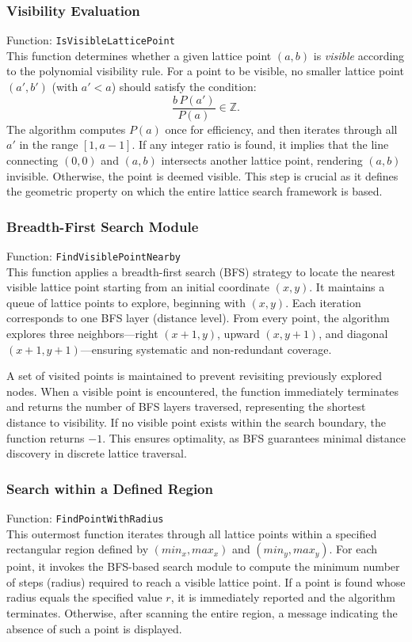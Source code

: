 \documentclass[12pt, reqno]{amsart}
\theoremstyle{definition}
\theoremstyle{remark}
\numberwithin{equation}{section}
\begin{document}
\subsubsection{Visibility Evaluation}

{Function: \texttt{IsVisibleLatticePoint}}\\
This function determines whether a given lattice point $(a,b)$ is \textit{visible} according to the polynomial visibility rule.  
For a point to be visible, no smaller lattice point $(a',b')$ (with $a' < a$) should satisfy the condition:
\[
\frac{b \, P(a')}{P(a)} \in \mathbb{Z}.
\]
The algorithm computes $P(a)$ once for efficiency, and then iterates through all $a'$ in the range $[1, a-1]$. If any integer ratio is found, it implies that the line connecting $(0,0)$ and $(a,b)$ intersects another lattice point, rendering $(a,b)$ invisible. Otherwise, the point is deemed visible.  
This step is crucial as it defines the geometric property on which the entire lattice search framework is based.

\subsubsection{Breadth-First Search Module}
{Function: \texttt{FindVisiblePointNearby}}\\
This function applies a breadth-first search (BFS) strategy to locate the nearest visible lattice point starting from an initial coordinate $(x, y)$.  
It maintains a queue of lattice points to explore, beginning with $(x,y)$. Each iteration corresponds to one BFS layer (distance level). From every point, the algorithm explores three neighbors—right $(x+1, y)$, upward $(x, y+1)$, and diagonal $(x+1, y+1)$—ensuring systematic and non-redundant coverage.  

A set of visited points is maintained to prevent revisiting previously explored nodes. When a visible point is encountered, the function immediately terminates and returns the number of BFS layers traversed, representing the shortest distance to visibility. If no visible point exists within the search boundary, the function returns $-1$.  
This ensures optimality, as BFS guarantees minimal distance discovery in discrete lattice traversal.

\subsubsection{Search within a Defined Region}

{Function: \texttt{FindPointWithRadius}}\\
This outermost function iterates through all lattice points within a specified rectangular region defined by $(min_x, max_x)$ and $(min_y, max_y)$. For each point, it invokes the BFS-based search module to compute the minimum number of steps (radius) required to reach a visible lattice point.  
If a point is found whose radius equals the specified value $r$, it is immediately reported and the algorithm terminates. Otherwise, after scanning the entire region, a message indicating the absence of such a point is displayed.  
\end{document}
